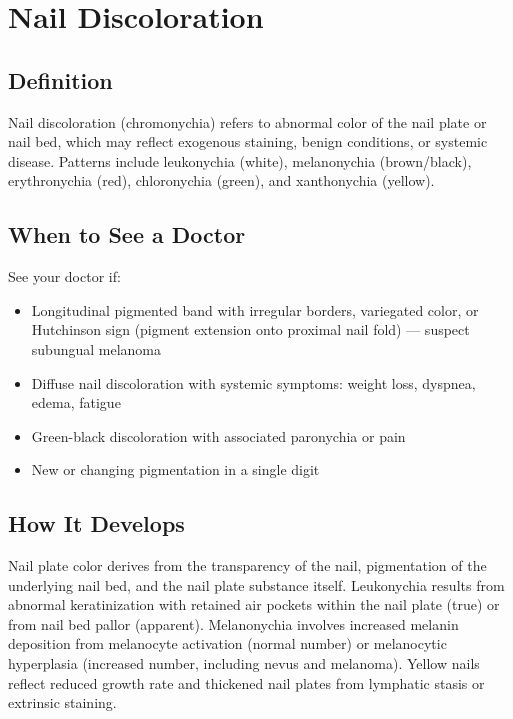 \chapter{Nail Discoloration}

\section*{Definition}
Nail discoloration (chromonychia) refers to abnormal color of the nail plate or nail bed, which may reflect exogenous staining, benign conditions, or systemic disease. Patterns include leukonychia (white), melanonychia (brown/black), erythronychia (red), chloronychia (green), and xanthonychia (yellow).

\section*{When to See a Doctor}
See your doctor if:
\begin{itemize}
  \item Longitudinal pigmented band with irregular borders, variegated color, or Hutchinson sign (pigment extension onto proximal nail fold) --- suspect subungual melanoma
  \item Diffuse nail discoloration with systemic symptoms: weight loss, dyspnea, edema, fatigue
  \item Green-black discoloration with associated paronychia or pain
  \item New or changing pigmentation in a single digit
\end{itemize}

\section*{How It Develops}
Nail plate color derives from the transparency of the nail, pigmentation of the underlying nail bed, and the nail plate substance itself. Leukonychia results from abnormal keratinization with retained air pockets within the nail plate (true) or from nail bed pallor (apparent). Melanonychia involves increased melanin deposition from melanocyte activation (normal number) or melanocytic hyperplasia (increased number, including nevus and melanoma). Yellow nails reflect reduced growth rate and thickened nail plates from lymphatic stasis or extrinsic staining.

